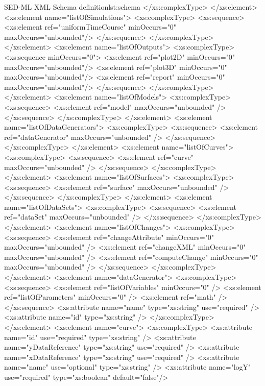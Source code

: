 \begin{myXmlLst}{SED-ML XML Schema definition}{lst:schema}
		</xs:complexType>
	</xs:element>
	<xs:element name="listOfSimulations">
		<xs:complexType>
			<xs:sequence>
				<xs:element ref="uniformTimeCourse" minOccurs="0" maxOccurs="unbounded"/>
			</xs:sequence>
		</xs:complexType>
	</xs:element>
	<xs:element name="listOfOutputs">
		<xs:complexType>
			<xs:sequence minOccurs="0">
				<xs:element ref="plot2D" minOccurs="0"  maxOccurs="unbounded"/>
				<xs:element ref="plot3D" minOccurs="0"  maxOccurs="unbounded"/>
				<xs:element ref="report" minOccurs="0"  maxOccurs="unbounded"/>
			</xs:sequence>
		</xs:complexType>
	</xs:element>
	<xs:element name="listOfModels">
		<xs:complexType>
			<xs:sequence>
				<xs:element ref="model" maxOccurs="unbounded" />
			</xs:sequence>
		</xs:complexType>
	</xs:element>
	<xs:element name="listOfDataGenerators">
		<xs:complexType>
			<xs:sequence>
				<xs:element ref="dataGenerator" maxOccurs="unbounded" />
			</xs:sequence>
		</xs:complexType>
	</xs:element>
	<xs:element name="listOfCurves">
		<xs:complexType>
			<xs:sequence>
				<xs:element ref="curve" maxOccurs="unbounded" />
			</xs:sequence>
		</xs:complexType>
	</xs:element>
	<xs:element name="listOfSurfaces">
		<xs:complexType>
			<xs:sequence>
				<xs:element ref="surface" maxOccurs="unbounded" />
			</xs:sequence>
		</xs:complexType>
	</xs:element>
	<xs:element name="listOfDataSets">
		<xs:complexType>
			<xs:sequence>
				<xs:element ref="dataSet" maxOccurs="unbounded" />
			</xs:sequence>
		</xs:complexType>
	</xs:element>
	<xs:element name="listOfChanges">
		<xs:complexType>
			<xs:sequence>
				<xs:element ref="changeAttribute" minOccurs="0"
					maxOccurs="unbounded" />
				<xs:element ref="changeXML" minOccurs="0" maxOccurs="unbounded" />
				<xs:element ref="computeChange" minOccurs="0" maxOccurs="unbounded" />
			</xs:sequence>
		</xs:complexType>
	</xs:element>
	<xs:element name="dataGenerator">
		<xs:complexType>
			<xs:sequence>
				<xs:element ref="listOfVariables" minOccurs="0" />
				<xs:element ref="listOfParameters" minOccurs="0" />
				<xs:element ref="math" />
			</xs:sequence>
			<xs:attribute name="name" type="xs:string" use="required" />
			<xs:attribute name="id" type="xs:string" />
		</xs:complexType>
	</xs:element>
	<xs:element name="curve">
		<xs:complexType>
		<xs:attribute name="id" use="required" type="xs:string" />
			<xs:attribute name="yDataReference" type="xs:string"
				use="required" />
			<xs:attribute name="xDataReference" type="xs:string"
				use="required" />
			<xs:attribute name="name" use="optional" type="xs:string" />
			<xs:attribute name="logY" use="required" type="xs:boolean" default="false"/>

\end{myXmlLst}
